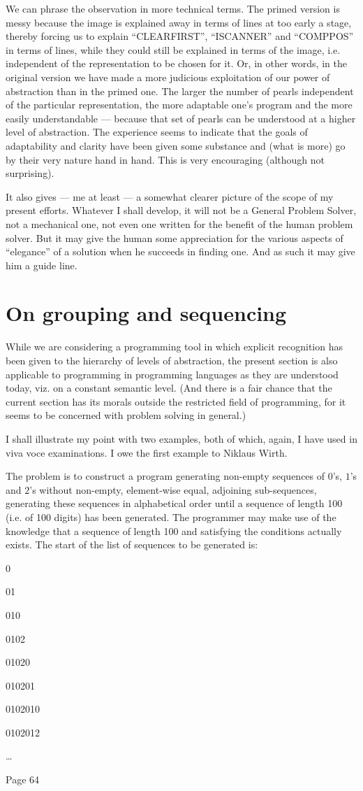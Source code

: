 We can phrase the observation in more technical terms. The primed version is messy because the image is explained away in terms of lines at too early a stage, thereby forcing us to explain ``CLEARFIRST'', ``ISCANNER'' and ``COMPPOS'' in terms of lines, while they could still be explained in terms of the image, i.e. independent of the representation to be chosen for it. Or, in other words, in the original version we have made a more judicious exploitation of our power of abstraction than in the primed one. The larger the number of pearls independent of the particular representation, the more adaptable one's program and the more easily understandable --- because that set of pearls can be understood at a higher level of abstraction. The experience seems to indicate that the goals of adaptability and clarity have been given some substance and (what is more) go by their very nature hand in hand. This is very encouraging (although not surprising).

It also gives --- me at least --- a somewhat clearer picture of the scope of my present efforts. Whatever I shall develop, it will not be a General Problem Solver, not a mechanical one, not even one written for the benefit of the human problem solver. But it may give the human some appreciation for the various aspects of ``elegance'' of a solution when he succeeds in finding one. And as such it may give him a guide line.

\section{On grouping and sequencing}

While we are considering a programming tool in which explicit recognition has been given to the hierarchy of levels of abstraction, the present section is also applicable to programming in programming languages as they are understood today, viz. on a constant semantic level. (And there is a fair chance that the current section has its morals outside the restricted field of programming, for it seems to be concerned with problem solving in general.)

I shall illustrate my point with two examples, both of which, again, I have used in viva voce examinations. I owe the first example to Niklaus Wirth.

The problem is to construct a program generating non-empty sequences of $0$'s, $1$'s and $2$'s without non-empty, element-wise equal, adjoining sub-sequences, generating these sequences in alphabetical order until a sequence of length 100 (i.e. of 100 digits) has been generated. The programmer may make use of the knowledge that a sequence of length 100 and satisfying the conditions actually exists. The start of the list of sequences to be generated is:

0

01

010

0102

01020

010201

0102010

0102012

\dots

Page 64